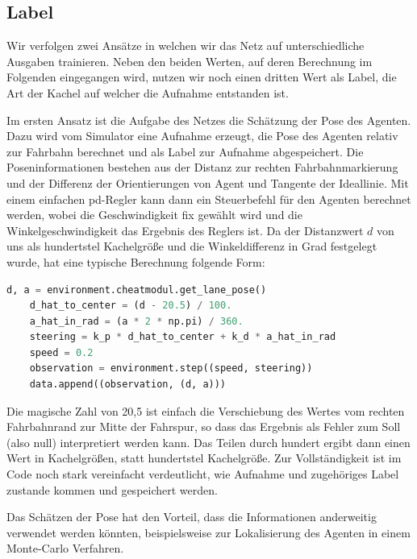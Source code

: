 \subsection{Label}

Wir verfolgen zwei Ansätze in welchen wir das Netz auf unterschiedliche Ausgaben trainieren. Neben den beiden Werten, auf deren Berechnung im Folgenden eingegangen wird, nutzen wir noch einen dritten Wert als Label, die Art der Kachel auf welcher die Aufnahme entstanden ist.

Im ersten Ansatz ist die Aufgabe des Netzes die Schätzung der Pose des Agenten. Dazu wird vom Simulator eine Aufnahme erzeugt, die Pose des Agenten relativ zur Fahrbahn berechnet und als Label zur Aufnahme abgespeichert. Die Poseninformationen bestehen aus der Distanz zur rechten Fahrbahnmarkierung und der Differenz der Orientierungen von Agent und Tangente der Ideallinie. Mit einem einfachen \acs{pd}-Regler kann dann ein Steuerbefehl für den Agenten berechnet werden, wobei die Geschwindigkeit fix gewählt wird und die Winkelgeschwindigkeit das Ergebnis des Reglers ist. Da der Distanzwert $d$ von uns als hundertstel Kachelgröße und die Winkeldifferenz in Grad festgelegt wurde, hat eine typische Berechnung folgende Form:\\

\begin{minipage}{\linewidth}
	\begin{lstlisting}[caption={Berechnung eines Steuerbefehls mit PD-Regler}, language=python]
	d, a = environment.cheatmodul.get_lane_pose()
	d_hat_to_center = (d - 20.5) / 100.
	a_hat_in_rad = (a * 2 * np.pi) / 360.
	steering = k_p * d_hat_to_center + k_d * a_hat_in_rad
	speed = 0.2
	observation = environment.step((speed, steering))
	data.append((observation, (d, a)))
	\end{lstlisting}
\end{minipage}

\vspace{.5cm}
Die magische Zahl von 20,5 ist einfach die Verschiebung des Wertes vom rechten Fahrbahnrand zur Mitte der Fahrspur, so dass das Ergebnis als Fehler zum Soll (also null) interpretiert werden kann. Das Teilen durch hundert ergibt dann einen Wert in Kachelgrößen, statt hundertstel Kachelgröße.
Zur Vollständigkeit ist im Code noch stark vereinfacht verdeutlicht, wie Aufnahme und zugehöriges Label zustande kommen und gespeichert werden.

Das Schätzen der Pose hat den Vorteil, dass die Informationen anderweitig verwendet werden könnten, beispielsweise zur Lokalisierung des Agenten in einem Monte-Carlo Verfahren.\\

